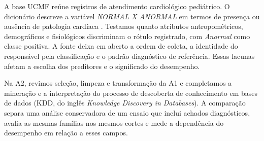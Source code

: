 A base UCMF reúne registros de atendimento cardiológico pediátrico. O dicionário descreve a variável \textit{NORMAL X ANORMAL} em termos de presença ou ausência de patologia cardíaca \cite{tema,dict}. Testamos quanto atributos antropométricos, demográficos e fisiológicos discriminam o rótulo registrado, com \textit{Anormal} como classe positiva. A fonte deixa em aberto a ordem de coleta, a identidade do responsável pela classificação e o padrão diagnóstico de referência. Essas lacunas afetam a escolha dos preditores e o significado do desempenho.

Na A2, revimos seleção, limpeza e transformação da A1 e completamos a mineração e a interpretação do processo de descoberta de conhecimento em bases de dados (KDD, do inglês \textit{Knowledge Discovery in Databases}). A comparação separa uma análise conservadora de um ensaio que inclui achados diagnósticos, avalia as mesmas famílias nos mesmos cortes e mede a dependência do desempenho em relação a esses campos.
